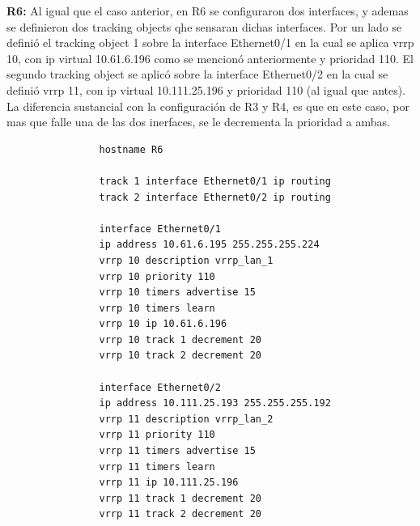 			\textbf{R6:}
			Al igual que el caso anterior, en R6 se configuraron dos interfaces, y 
			ademas se definieron dos tracking objects qhe sensaran dichas interfaces. 
			Por un lado se definió el tracking object 1 sobre la interface Ethernet0/1
			en la cual se aplica vrrp 10, con ip virtual 10.61.6.196 como se mencionó
			anteriormente y prioridad 110. El segundo tracking object se aplicó sobre
			la interface Ethernet0/2 en la cual se definió vrrp 11, con ip virtual 
			10.111.25.196 y prioridad 110 (al igual que antes). La diferencia sustancial
			con la configuración de R3 y R4, es que en este caso, por mas que falle una
			de las dos inerfaces, se le decrementa la prioridad a ambas.
			\begin{verbatim}
				hostname R6

				track 1 interface Ethernet0/1 ip routing
				track 2 interface Ethernet0/2 ip routing

				interface Ethernet0/1
				ip address 10.61.6.195 255.255.255.224
				vrrp 10 description vrrp_lan_1
				vrrp 10 priority 110
				vrrp 10 timers advertise 15
				vrrp 10 timers learn
				vrrp 10 ip 10.61.6.196
				vrrp 10 track 1 decrement 20
				vrrp 10 track 2 decrement 20

				interface Ethernet0/2
				ip address 10.111.25.193 255.255.255.192
				vrrp 11 description vrrp_lan_2
				vrrp 11 priority 110
				vrrp 11 timers advertise 15
				vrrp 11 timers learn
				vrrp 11 ip 10.111.25.196
				vrrp 11 track 1 decrement 20
				vrrp 11 track 2 decrement 20
			\end{verbatim}